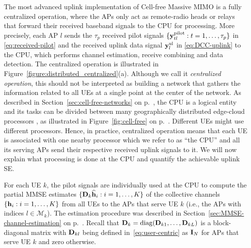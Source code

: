 The most advanced uplink implementation of Cell-free Massive MIMO is a fully centralized 
operation, where the APs only act as remote-radio heads or relays that forward their received baseband signals to the CPU for processing.
More precisely, each AP $l$ sends the $\tau_p$ received pilot signals $\{ \mathbf{y}_{t l}^{\rm pilot} : t = 1,\ldots,\tau_p \}$ in \eqref{eq:received-pilot} and the received uplink data signal $\mathbf{y}_{l}^{\rm{ul}}$ in \eqref{eq:DCC-uplink} to the CPU, which performs channel estimation, receive combining and data detection. The centralized operation is illustrated in Figure~\ref{figure:distributed_centralized}(a).  Although we call it \emph{centralized operation}, this should not be interpreted as building a network that gathers the information related to all UEs at a single point at the center of the network. As described in Section~\ref{sec:cell-free-networks} on p.~\pageref{sec:cell-free-networks}, the CPU is a logical entity and its tasks can be divided between many geographically distributed edge-cloud processors \cite{Interdonato2019a}, as illustrated in Figure~\ref{fig:cell-free} on p.~\pageref{fig:cell-free}. Different UEs might use different processors. Hence, in practice, centralized operation means that each UE is associated with one nearby processor which we refer to as ``the CPU'' and all its serving APs send their respective received uplink signals to it. We will now explain what processing is done at the CPU and quantify the achievable uplink SE.





For each UE $k$, the pilot signals are individually used at the CPU  to compute the partial MMSE estimates $\{\mathbf{D}_{k}\widehat{\mathbf{h}}_{i} : i= 1, \ldots,K\}$ of the collective channels $\{{\mathbf{h}}_{i} : i=1,\ldots,K\}$ from all UEs to the APs that serve UE $k$ (i.e., the APs with indices $l\in \mathcal{M}_k$). 
The estimation procedure was described in Section~\ref{sec:MMSE-channel-estimation} on p.~\pageref{sec:MMSE-channel-estimation}.
Recall that $\mathbf{D}_{k}  = \mathrm{diag}( \mathbf{D}_{k1} , \ldots, \mathbf{D}_{kL} )$ is a block-diagonal matrix with $\mathbf{D}_{kl}$ being defined in~\eqref{eq:user-centric} as $\mathbf{I}_N$ for APs that serve UE $k$ and zero otherwise. 

